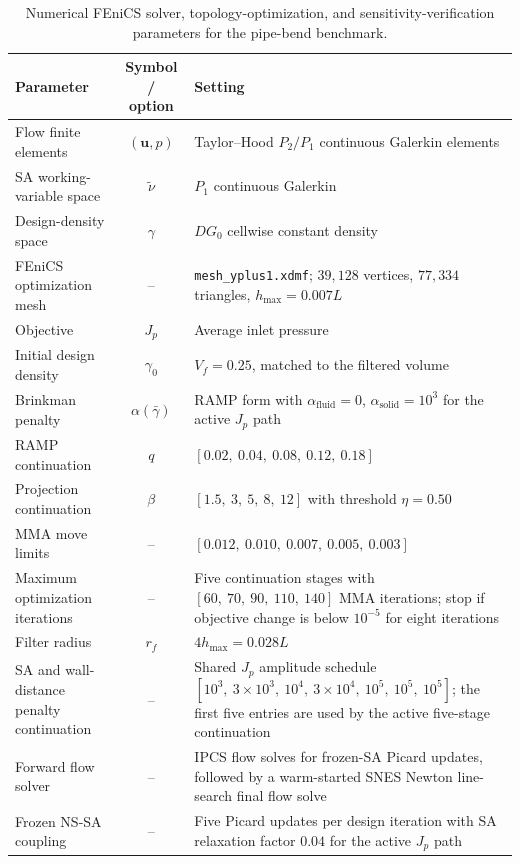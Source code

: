 \begin{table}[htbp]
	\centering
	\footnotesize
	\caption{Numerical FEniCS solver, topology-optimization, and sensitivity-verification parameters for the pipe-bend benchmark.}
	\label{tab:app_B_alexandersen_pipebend_numerical}
	\renewcommand{\arraystretch}{1.2}
	\begin{tabularx}{\textwidth}{l c X}
		\hline
		\textbf{Parameter} & \textbf{Symbol / option} & \textbf{Setting} \\
		\hline
		Flow finite elements & $(\mathbf{u},p)$ & Taylor--Hood $P_2/P_1$ continuous Galerkin elements \\
		SA working-variable space & $\tilde{\nu}$ & $P_1$ continuous Galerkin \\
		Design-density space & $\gamma$ & $DG_0$ cellwise constant density \\
		FEniCS optimization mesh & -- & \texttt{mesh\_yplus1.xdmf}; $39{,}128$ vertices, $77{,}334$ triangles, $h_{\max}=0.007L$ \\
		Objective & $J_p$ & Average inlet pressure \\
		Initial design density & $\gamma_0$ & $V_f=0.25$, matched to the filtered volume \\
			Brinkman penalty & $\alpha(\bar{\gamma})$ & RAMP form with $\alpha_{\mathrm{fluid}}=0$, $\alpha_{\mathrm{solid}}=10^3$ for the active $J_p$ path \\
			RAMP continuation & $q$ & $[0.02,\ 0.04,\ 0.08,\ 0.12,\ 0.18]$ \\
			Projection continuation & $\beta$ & $[1.5,\ 3,\ 5,\ 8,\ 12]$ with threshold $\eta=0.50$ \\
			MMA move limits & -- & $[0.012,\ 0.010,\ 0.007,\ 0.005,\ 0.003]$ \\
			Maximum optimization iterations & -- & Five continuation stages with $[60,\ 70,\ 90,\ 110,\ 140]$ MMA iterations; stop if objective change is below $10^{-5}$ for eight iterations \\
			Filter radius & $r_f$ & $4h_{\max}=0.028L$ \\
			SA and wall-distance penalty continuation & -- & Shared $J_p$ amplitude schedule $[10^3,\ 3\times10^3,\ 10^4,\ 3\times10^4,\ 10^5,\ 10^5,\ 10^5]$; the first five entries are used by the active five-stage continuation \\
			Forward flow solver & -- & IPCS flow solves for frozen-SA Picard updates, followed by a warm-started SNES Newton line-search final flow solve \\
			Frozen NS-SA coupling & -- & Five Picard updates per design iteration with SA relaxation factor $0.04$ for the active $J_p$ path \\

\end{tabularx}
\end{table}
